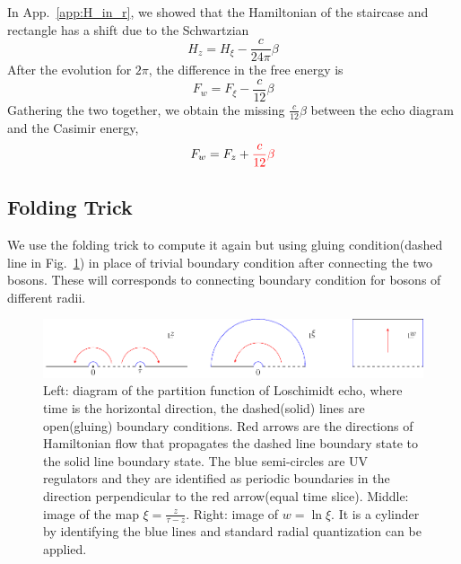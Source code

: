 \documentclass{article}
\begin{document}
In App.~\ref{app:H_in_r}, we showed that the Hamiltonian of the staircase and rectangle has a shift due to the Schwartzian
\begin{equation}
H_{z} = H_{\xi} - \frac{c}{24\pi} \beta 
\end{equation}
After the evolution for $2\pi$, the difference in the free energy is
\begin{equation}
F_w = F_{\xi} - \frac{c}{12} \beta 
\end{equation}
Gathering the two together, we obtain the missing $\frac{c}{12} \beta$ between the echo diagram and the Casimir energy, 
\begin{equation}
F_{w} = F_z + {\color{red} \frac{c}{12}\beta }
\end{equation}


\subsection{Folding Trick}


We use the folding trick to compute it again but using gluing condition(dashed line in Fig.~\ref{fig:H-tau_fold}) in place of trivial boundary condition after connecting the two bosons. These will corresponds to connecting boundary condition for bosons of different radii.

\begin{figure}[htb]
\centering
\includegraphics[width=	extwidth]{fig_H-tau_fold}\caption{Left: diagram of the partition function of Loschimidt echo, where time is the horizontal direction, the dashed(solid) lines are open(gluing) boundary conditions. Red arrows are the directions of Hamiltonian flow that propagates the dashed line boundary state to the solid line boundary state. The blue semi-circles are UV regulators and they are identified as periodic boundaries in the direction perpendicular to the red arrow(equal time slice). Middle: image of the map $\xi = \frac{z}{\tau - z}$. Right: image of $w = \ln \xi$. It is a cylinder by identifying the blue lines and standard radial quantization can be applied. }
\label{fig:H-tau_fold}
\end{figure}
\end{document}
